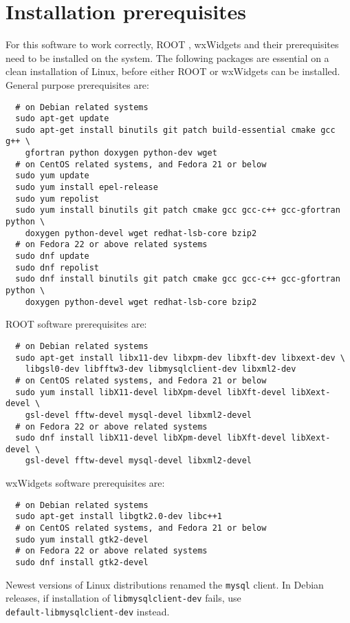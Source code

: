 \documentclass[12pt,a4paper]{report}
\begin{document}
\section{Installation prerequisites}
For this software to work correctly, ROOT \cite{root}, wxWidgets \cite{wxWidgets} and their prerequisites need to be installed on the system. The following packages are essential on a clean installation of Linux, before either ROOT or wxWidgets can be installed. General purpose prerequisites are:
\footnotesize
\begin{verbatim}
  # on Debian related systems
  sudo apt-get update
  sudo apt-get install binutils git patch build-essential cmake gcc g++ \
    gfortran python doxygen python-dev wget
  # on CentOS related systems, and Fedora 21 or below
  sudo yum update
  sudo yum install epel-release
  sudo yum repolist
  sudo yum install binutils git patch cmake gcc gcc-c++ gcc-gfortran python \
    doxygen python-devel wget redhat-lsb-core bzip2
  # on Fedora 22 or above related systems
  sudo dnf update
  sudo dnf repolist
  sudo dnf install binutils git patch cmake gcc gcc-c++ gcc-gfortran python \
    doxygen python-devel wget redhat-lsb-core bzip2
\end{verbatim}
\normalsize
ROOT software prerequisites are:
\footnotesize
\begin{verbatim}
  # on Debian related systems
  sudo apt-get install libx11-dev libxpm-dev libxft-dev libxext-dev \
    libgsl0-dev libfftw3-dev libmysqlclient-dev libxml2-dev
  # on CentOS related systems, and Fedora 21 or below
  sudo yum install libX11-devel libXpm-devel libXft-devel libXext-devel \
    gsl-devel fftw-devel mysql-devel libxml2-devel
  # on Fedora 22 or above related systems
  sudo dnf install libX11-devel libXpm-devel libXft-devel libXext-devel \
    gsl-devel fftw-devel mysql-devel libxml2-devel
\end{verbatim}
\normalsize
wxWidgets software prerequisites are:
\footnotesize
\begin{verbatim}
  # on Debian related systems
  sudo apt-get install libgtk2.0-dev libc++1
  # on CentOS related systems, and Fedora 21 or below
  sudo yum install gtk2-devel 
  # on Fedora 22 or above related systems
  sudo dnf install gtk2-devel 
\end{verbatim}
\normalsize
Newest versions of Linux distributions renamed the \texttt{mysql} client. In Debian releases, if installation of \texttt{libmysqlclient-dev} fails, use \\\texttt{default-libmysqlclient-dev} instead.
\end{document}
